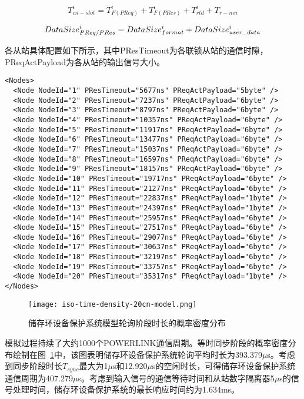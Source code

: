 \begin{equation}
\label{equation43}
T_{cn-slot}^{i}=T_{F(PReq)}^{i}+T_{F(PRes)}^{i}+T_{rtd}^{i}+T_{r-mn}
\end{equation}


\begin{equation}
\label{equation44}
DataSize_{PReq/PRes}^{i} = DataSize_{format}^{i}+DataSize_{user\_data}^{i}\\
\end{equation}

各从站具体配置如下所示，其中PResTimeout为各联锁从站的通信时隙，PReqActPayload为各从站的输出信号大小。

\begin{lstlisting}
<Nodes>
  <Node NodeId="1" PResTimeout="5677ns" PReqActPayload="5byte" />
  <Node NodeId="2" PResTimeout="7237ns" PReqActPayload="6byte" />
  <Node NodeId="3" PResTimeout="8797ns" PReqActPayload="6byte" />
  <Node NodeId="4" PResTimeout="10357ns" PReqActPayload="6byte" />
  <Node NodeId="5" PResTimeout="11917ns" PReqActPayload="6byte" />
  <Node NodeId="6" PResTimeout="13477ns" PReqActPayload="6byte" />
  <Node NodeId="7" PResTimeout="15037ns" PReqActPayload="6byte" />
  <Node NodeId="8" PResTimeout="16597ns" PReqActPayload="6byte" />
  <Node NodeId="9" PResTimeout="18157ns" PReqActPayload="6byte" />
  <Node NodeId="10" PResTimeout="19717ns" PReqActPayload="6byte" />
  <Node NodeId="11" PResTimeout="21277ns" PReqActPayload="6byte" />
  <Node NodeId="12" PResTimeout="22837ns" PReqActPayload="1byte" />
  <Node NodeId="13" PResTimeout="24397ns" PReqActPayload="1byte" />
  <Node NodeId="14" PResTimeout="25957ns" PReqActPayload="6byte" />
  <Node NodeId="15" PResTimeout="27517ns" PReqActPayload="6byte" />
  <Node NodeId="16" PResTimeout="29077ns" PReqActPayload="6byte" />
  <Node NodeId="17" PResTimeout="30637ns" PReqActPayload="6byte" />
  <Node NodeId="18" PResTimeout="32197ns" PReqActPayload="6byte" />
  <Node NodeId="19" PResTimeout="33757ns" PReqActPayload="6byte" />
  <Node NodeId="20" PResTimeout="35317ns" PReqActPayload="1byte" />
</Nodes>
\end{lstlisting}

\begin{figure}[!htb]
  \centering
  \texttt{[image: iso-time-density-20cn-model.png]}
  \caption{储存环设备保护系统模型轮询阶段时长的概率密度分布}
  \label{fig:iso-time-density-20cn-model}
\end{figure}

模拟过程持续了大约1000个POWERLINK通信周期。等时同步阶段的概率密度分布绘制在图~\ref{fig:iso-time-density-20cn-model}中，该图表明储存环设备保护系统轮询平均时长为393.379$\mu$s。考虑到同步阶段时长$T_{sync}$最大为1$\mu$s和12.920$\mu$s的空闲时长，可得储存环设备保护系统通信周期为407.279$\mu$s。考虑到输入信号的通信等待时间和从站数字隔离器5$\mu$s的信号处理时间，储存环设备保护系统的最长响应时间约为1.634ms。

